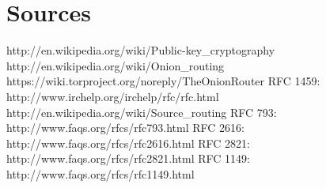 \documentclass[12pt,a4paper]{book}
\begin{document}
\chapter{Sources}
\begin{thebibliography}{42}
 http://en.wikipedia.org/wiki/Public-key\_cryptography
 http://en.wikipedia.org/wiki/Onion\_routing
 https://wiki.torproject.org/noreply/TheOnionRouter
 RFC 1459: http://www.irchelp.org/irchelp/rfc/rfc.html
 http://en.wikipedia.org/wiki/Source\_routing
 RFC 793: http://www.faqs.org/rfcs/rfc793.html
 RFC 2616: http://www.faqs.org/rfcs/rfc2616.html
 RFC 2821: http://www.faqs.org/rfcs/rfc2821.html
 RFC 1149: http://www.faqs.org/rfcs/rfc1149.html
\end{thebibliography}
\end{document}
